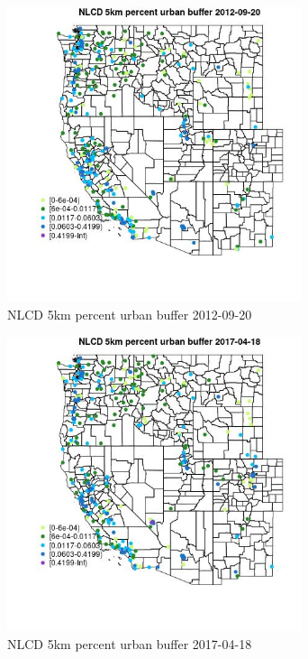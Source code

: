 \begin{figure} 
\centering  
\includegraphics[width=0.77\textwidth]{Code_Outputs/Report_ML_input_PM25_Step4_part_e_de_duplicated_aves_compiled_2019-05-14wNAs_MapObsNLCD_5km_percent_urban_buffer2012-09-20.jpg} 
\caption{\label{fig:Report_ML_input_PM25_Step4_part_e_de_duplicated_aves_compiled_2019-05-14wNAsMapObsNLCD_5km_percent_urban_buffer2012-09-20}NLCD 5km percent urban buffer 2012-09-20} 
\end{figure} 
 

\begin{figure} 
\centering  
\includegraphics[width=0.77\textwidth]{Code_Outputs/Report_ML_input_PM25_Step4_part_e_de_duplicated_aves_compiled_2019-05-14wNAs_MapObsNLCD_5km_percent_urban_buffer2017-04-18.jpg} 
\caption{\label{fig:Report_ML_input_PM25_Step4_part_e_de_duplicated_aves_compiled_2019-05-14wNAsMapObsNLCD_5km_percent_urban_buffer2017-04-18}NLCD 5km percent urban buffer 2017-04-18} 
\end{figure} 
 

